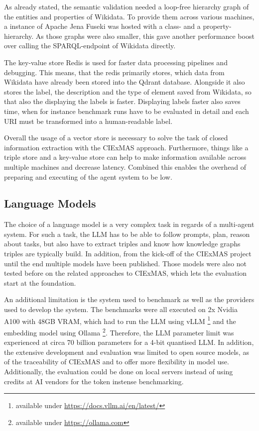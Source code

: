 \documentclass[a4paper,oneside,bibliography=totoc]{scrbook}
\begin{document}
As already stated, the semantic validation needed a loop-free hierarchy graph of the entities and properties of Wikidata. To provide them across various machines, a instance of Apache Jena Fuseki was hosted with a class- and a property-hierarchy. As those graphs were also smaller, this gave another performance boost over calling the SPARQL-endpoint of Wikidata directly.

The key-value store Redis is used for faster data processing pipelines and debugging. This means, that the redis primarily stores, which data from Wikidata have already been stored into the Qdrant database. Alongside it also stores the label, the description and the type of element saved from Wikidata, so that also the displaying the labels is faster. Displaying labels faster also saves time, when for instance benchmark runs have to be evaluated in detail and each URI must be transformed into a human-readable label.

Overall the usage of a vector store is necessary to solve the task of closed information extraction with the CIExMAS approach. Furthermore, things like a triple store and a key-value store can help to make information available across multiple machines and decrease latency. Combined this enables the overhead of preparing and executing of the agent system to be low.

\subsection{Language Models}
\label{subsec:eval_language_models}

The choice of a language model is a very complex task in regards of a multi-agent system. For such a task, the \ac{LLM} has to be able to follow prompts, plan, reason about tasks, but also have to extract triples and know how knowledge graphs triples are typically build. In addition, from the kick-off of the CIExMAS project until the end multiple models have been published. Those models were also not tested before on the related approaches to CIExMAS, which lets the evaluation start at the foundation.

An additional limitation is the system used to benchmark as well as the providers used to develop the system. The benchmarks were all executed on 2x Nvidia A100 with 48GB VRAM, which had to run the \ac{LLM} using vLLM \footnote{available under \url{https://docs.vllm.ai/en/latest/}} and the embedding model using Ollama \footnote{available under \url{https://ollama.com}}. Therefore, the \ac{LLM} parameter limit was experienced at circa 70 billion parameters for a 4-bit quantised \ac{LLM}. In addition, the extensive development and evaluation was limited to open source models, as of the traceability of CIExMAS and to offer more flexibility in model use. Additionally, the evaluation could be done on local servers instead of using credits at AI vendors for the token instense benchmarking.
\end{document}
